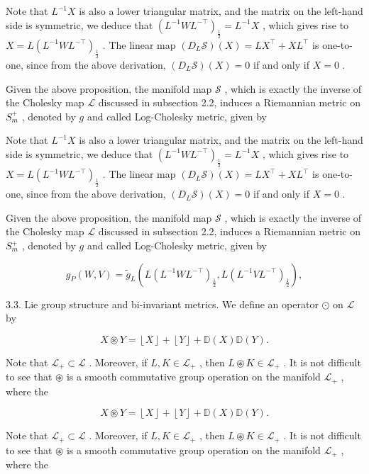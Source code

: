 \documentclass[11pt]{article}
\begin{document}
Note that  $L^{-1}X$  is also a lower triangular matrix, and the matrix on the left-hand side is symmetric, we deduce that  $(L^{-1}WL^{-\top})_{\frac{1}{2}} = L^{-1}X$ , which gives rise to  $X = L(L^{-1}WL^{-\top})_{\frac{1}{2}}$ . The linear map  $(D_L\mathcal{S})(X) = LX^\top +XL^\top$  is one-to-one, since from the above derivation,  $(D_L\mathcal{S})(X) = 0$  if and only if  $X = 0$ .

Given the above proposition, the manifold map  $\mathcal{S}$ , which is exactly the inverse of the Cholesky map  $\mathcal{L}$  discussed in subsection 2.2, induces a Riemannian metric on  $S_{m}^{+}$ , denoted by  $g$  and called Log-Cholesky metric, given by

Note that  $L^{-1}X$  is also a lower triangular matrix, and the matrix on the left-hand side is symmetric, we deduce that  $(L^{-1}WL^{-\top})_{\frac{1}{2}} = L^{-1}X$ , which gives rise to  $X = L(L^{-1}WL^{-\top})_{\frac{1}{2}}$ . The linear map  $(D_L\mathcal{S})(X) = LX^\top +XL^\top$  is one-to-one, since from the above derivation,  $(D_L\mathcal{S})(X) = 0$  if and only if  $X = 0$ .

Given the above proposition, the manifold map  $\mathcal{S}$ , which is exactly the inverse of the Cholesky map  $\mathcal{L}$  discussed in subsection 2.2, induces a Riemannian metric on  $S_{m}^{+}$ , denoted by  $g$  and called Log-Cholesky metric, given by

$$
g _ {P} (W, V) = \tilde {g} _ {L} \left(L \left(L ^ {- 1} W L ^ {- \top}\right) _ {\frac {1}{2}}, L \left(L ^ {- 1} V L ^ {- \top}\right) _ {\frac {1}{2}}\right), \tag {3.1}
$$

3.3. Lie group structure and bi-invariant metrics. We define an operator  $\odot$  on  $\mathcal{L}$  by

$$
X \circledast Y = \left\lfloor X \right\rfloor + \left\lfloor Y \right\rfloor + \mathbb {D} (X) \mathbb {D} (Y).
$$

Note that  $\mathcal{L}_{+} \subset \mathcal{L}$ . Moreover, if  $L, K \in \mathcal{L}_{+}$ , then  $L \circledast K \in \mathcal{L}_{+}$ . It is not difficult to see that  $\circledast$  is a smooth commutative group operation on the manifold  $\mathcal{L}_{+}$ , where the

$$
X \circledast Y = \left\lfloor X \right\rfloor + \left\lfloor Y \right\rfloor + \mathbb {D} (X) \mathbb {D} (Y).
$$

Note that  $\mathcal{L}_{+} \subset \mathcal{L}$ . Moreover, if  $L, K \in \mathcal{L}_{+}$ , then  $L \circledast K \in \mathcal{L}_{+}$ . It is not difficult to see that  $\circledast$  is a smooth commutative group operation on the manifold  $\mathcal{L}_{+}$ , where the
\end{document}
